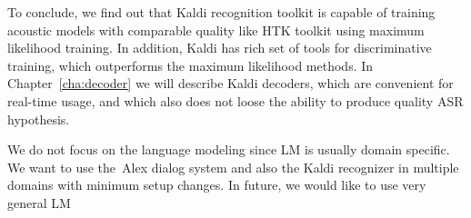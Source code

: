 To conclude, we find out that Kaldi recognition toolkit is capable of training acoustic models with comparable quality 
like \ac{HTK} toolkit using maximum likelihood training. In addition, Kaldi has rich set of tools for discriminative training, 
which outperforms the maximum likelihood methods.
In Chapter~\ref{cha:decoder} we will describe Kaldi decoders, which are convenient for real-time usage, 
and which also does not loose the ability to produce quality ASR hypothesis.

We do not focus on the language modeling since \ac{LM} is usually domain specific.
We want to use the~Alex dialog system and also the Kaldi recognizer in multiple domains with minimum
setup changes. 
In future, we would like to use very general \ac{LM} 







